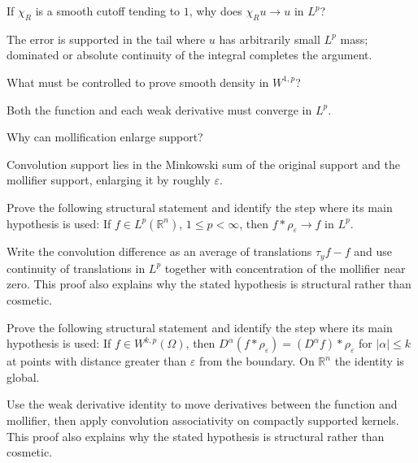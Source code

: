 \begin{problem}\label{prob:iii22-problem-06}
If \(\chi_R\) is a smooth cutoff tending to \(1\), why does \(\chi_Ru\to u\) in \(L^p\)?
\end{problem}
\begin{solution}
The error is supported in the tail where \(u\) has arbitrarily small
\(L^p\) mass; dominated or absolute continuity of the integral completes the
argument.
\end{solution}

\begin{problem}\label{prob:iii22-problem-07}
What must be controlled to prove smooth density in \(W^{1,p}\)?
\end{problem}
\begin{solution}
Both the function and each weak derivative must converge in \(L^p\).
\end{solution}

\begin{problem}\label{prob:iii22-problem-08}
Why can mollification enlarge support?
\end{problem}
\begin{solution}
Convolution support lies in the Minkowski sum of the original support and
the mollifier support, enlarging it by roughly \(\varepsilon\).
\end{solution}

\begin{problem}\label{prob:iii22-problem-09}
Prove the following structural statement and identify the step where its main hypothesis is used: If $f\in L^p(\mathbb R^n)$, $1\le p<\infty$, then $f*\rho_\varepsilon\to f$ in $L^p$.
\end{problem}
\begin{solution}
Write the convolution difference as an average of translations $\tau_yf-f$ and use continuity of translations in $L^p$ together with concentration of the mollifier near zero. This proof also explains why the stated hypothesis is structural rather than cosmetic.
\end{solution}

\begin{problem}\label{prob:iii22-problem-10}
Prove the following structural statement and identify the step where its main hypothesis is used: If $f\in W^{k,p}(\Omega)$, then $D^\alpha(f*\rho_\varepsilon)=(D^\alpha f)*\rho_\varepsilon$ for $|\alpha|\le k$ at points with distance greater than $\varepsilon$ from the boundary. On $\mathbb R^n$ the identity is global.
\end{problem}
\begin{solution}
Use the weak derivative identity to move derivatives between the function and mollifier, then apply convolution associativity on compactly supported kernels. This proof also explains why the stated hypothesis is structural rather than cosmetic.
\end{solution}

